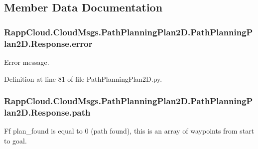 \subsection{Member Data Documentation}
\hypertarget{classRappCloud_1_1CloudMsgs_1_1PathPlanningPlan2D_1_1PathPlanningPlan2D_1_1Response_aa443ce1f1cb22d23bcba2070ea010454}{
\subsubsection[{error}]{\setlength{\rightskip}{0pt plus 5cm}Rapp\-Cloud.\-Cloud\-Msgs.\-Path\-Planning\-Plan2\-D.\-Path\-Planning\-Plan2\-D.\-Response.\-error}}\label{classRappCloud_1_1CloudMsgs_1_1PathPlanningPlan2D_1_1PathPlanningPlan2D_1_1Response_aa443ce1f1cb22d23bcba2070ea010454}


Error message. 



Definition at line 81 of file Path\-Planning\-Plan2\-D.\-py.

\hypertarget{classRappCloud_1_1CloudMsgs_1_1PathPlanningPlan2D_1_1PathPlanningPlan2D_1_1Response_a524bf341f8ba5dc312863f99d4d1dac4}{
\subsubsection[{path}]{\setlength{\rightskip}{0pt plus 5cm}Rapp\-Cloud.\-Cloud\-Msgs.\-Path\-Planning\-Plan2\-D.\-Path\-Planning\-Plan2\-D.\-Response.\-path}}\label{classRappCloud_1_1CloudMsgs_1_1PathPlanningPlan2D_1_1PathPlanningPlan2D_1_1Response_a524bf341f8ba5dc312863f99d4d1dac4}


Ff plan\-\_\-found is equal to 0 (path found), this is an array of waypoints from start to goal. 



